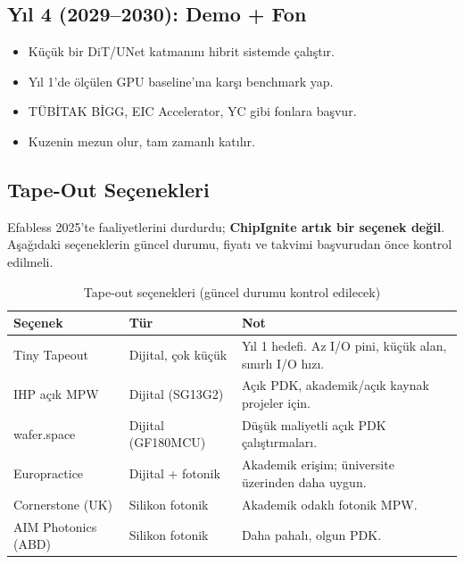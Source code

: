 \documentclass[11pt,a4paper]{article}
\begin{document}
\subsection{Yıl 4 (2029--2030): Demo + Fon}

\begin{itemize}
    \item Küçük bir DiT/UNet katmanını hibrit sistemde çalıştır.
    \item Yıl 1'de ölçülen GPU baseline'ına karşı benchmark yap.
    \item TÜBİTAK BİGG, EIC Accelerator, YC gibi fonlara başvur.
    \item Kuzenin mezun olur, tam zamanlı katılır.
\end{itemize}

\subsection{Tape-Out Seçenekleri}
\label{sec:mpw}

\begin{warnbox}
Efabless 2025'te faaliyetlerini durdurdu; \textbf{ChipIgnite artık bir seçenek değil}. Aşağıdaki seçeneklerin güncel durumu, fiyatı ve takvimi başvurudan önce kontrol edilmeli.
\end{warnbox}

\begin{table}[h!]
\centering
\small
\begin{tabular}{@{}p{3.5cm}p{3cm}p{7.5cm}@{}}
\toprule
\textbf{Seçenek} & \textbf{Tür} & \textbf{Not} \\
\midrule
Tiny Tapeout & Dijital, çok küçük & Yıl 1 hedefi. Az I/O pini, küçük alan, sınırlı I/O hızı. \\
IHP açık MPW & Dijital (SG13G2) & Açık PDK, akademik/açık kaynak projeler için. \\
wafer.space & Dijital (GF180MCU) & Düşük maliyetli açık PDK çalıştırmaları. \\
Europractice & Dijital + fotonik & Akademik erişim; üniversite üzerinden daha uygun. \\
Cornerstone (UK) & Silikon fotonik & Akademik odaklı fotonik MPW. \\
AIM Photonics (ABD) & Silikon fotonik & Daha pahalı, olgun PDK. \\
\bottomrule
\end{tabular}
\caption{Tape-out seçenekleri (güncel durumu kontrol edilecek)}
\end{table}
\end{document}
